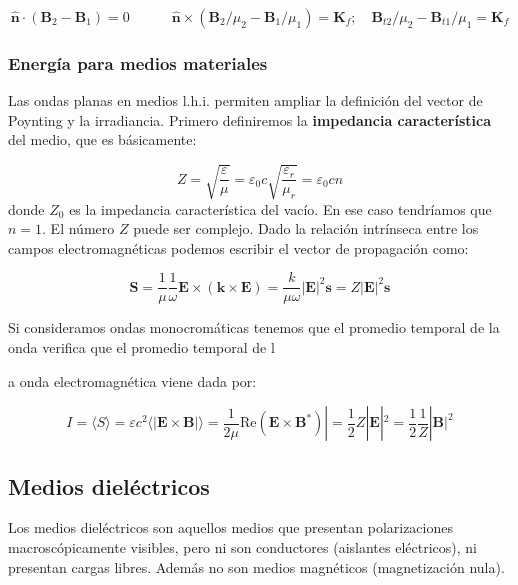 \documentclass[12pt,a4paper]{article}
\newcommand{\Real}{\mathrm{Re}}
\newcommand{\tquad}{\quad \quad \quad}
\newcommand{\Bn}{\mathbf{B}}
\newcommand{\En}{\mathbf{E}}
\newcommand{\kn}{\mathbf{k}}
\newcommand{\Kn}{\mathbf{K}}
\newcommand{\Sn}{\mathbf{S}}
\newcommand{\sn}{\mathbf{s}}
\newcommand{\hnn}{\hat{\mathbf{n}}}
\numberwithin{equation}{section}
\numberwithin{figure}{section}
\begin{document}
\begin{equation}
\hnn \cdot (\Bn_2-\Bn_1)=0  \tquad \hnn \times (\Bn_2 / \mu_2 - \Bn_1 / \mu_1) = \Kn_f; \quad \Bn_{t2} / \mu_2 - \Bn_{t1} / \mu_1 = \Kn_f 
\end{equation}



\subsubsection{Energía para medios materiales}

Las ondas planas en medios l.h.i. permiten ampliar la definición del vector de Poynting y la irradiancia. Primero definiremos la \textbf{impedancia característica} del medio, que es básicamente:

\begin{equation}
Z = \sqrt{\dfrac{\varepsilon}{\mu}} = \varepsilon_0 c \sqrt{\frac{\varepsilon_r}{\mu_r}}= \varepsilon_0 c n
\end{equation}
donde $Z_0$ es la impedancia característica del vacío. En ese caso tendríamos que $n=1$. El número $Z$ puede ser complejo. Dado la relación intrínseca entre los campos electromagnéticas podemos escribir el vector de propagación como:

\begin{equation}
\Sn = \dfrac{1}{\mu} \dfrac{1}{\omega} \En \times ( \kn \times  \En ) = \dfrac{k}{ \mu \omega} | \En |^2 \sn  = Z |\En| ^2 \sn
\end{equation}

Si consideramos ondas monocromáticas tenemos que el promedio temporal de la onda verifica que el promedio temporal de l

a onda electromagnética viene dada por:

\begin{equation}
I = \langle S \rangle = \varepsilon c^2 \langle | \En \times \Bn | \rangle = \dfrac{1}{2 \mu} \Real ( \En \times \Bn^*)| = \dfrac{1}{2}  Z |\En|^2 = \dfrac{1}{2} \dfrac{1}{Z} |\Bn|^2 \label{Ec:5.1.5.013-Irradiancia}
\end{equation}

\subsection{Medios dieléctricos}

Los medios dieléctricos son aquellos medios que presentan polarizaciones macroscópicamente visibles, pero ni son conductores (aislantes eléctricos), ni presentan cargas libres. Además no son medios magnéticos (magnetización nula). \\
\end{document}
